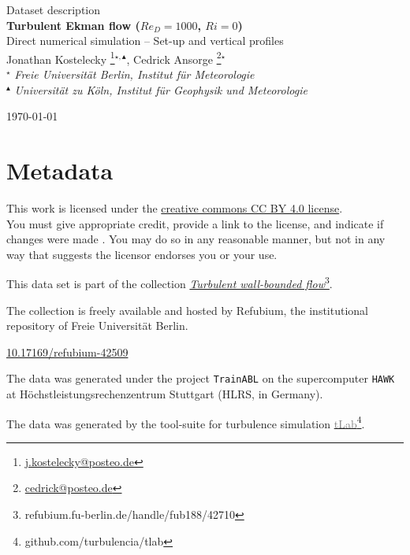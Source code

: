 \documentclass[11pt]{article}
\date{\nodate}
\makeatletter
\newcommand{\dstitle}{Turbulent Ekman flow ($Re_D=1000$, $Ri=0$)}
\newcommand{\subtitle}{Direct numerical simulation -- Set-up and vertical profiles}
\newcommand{\doi}{10.17169/refubium-42509}
\newcommand{\tlabName}{\textcolor{gray}{tLab}}
\newcommand{\authors}{
    Jonathan Kostelecky \footnote{\href{mailto:j.kostelecky@posteo.de}{j.kostelecky@posteo.de}}$^{\star,\blacktriangle}$, \hspace{0.05cm}  
    Cedrick Ansorge     \footnote{\href{mailto:cedrick@posteo.de}{cedrick@posteo.de}}$^\star$ \\  
    {\small \light{$^\star$ \emph{ Freie Universit\"at Berlin, Institut f\"ur Meteorologie} \\
    $^{\blacktriangle}$ \emph{Universit\"at zu K\"oln, Institut f\"ur Geophysik und Meteorologie}}}}
\newcommand{\light}[1]{\textcolor{black!80}{#1}}
\newcommand{\printdoi}[1]{\href{https://dx.doi.org/#1}{#1}}
\makeatother
\begin{document}
{ \selectfont
\begin{centering}

 \light{\large Dataset description} \\[1em] 
 {\LARGE \bfseries \sffamily\dstitle} \\[1em]
 \light{\large\subtitle} \\[1em]
 \authors\\ 
\end{centering}
\light{\hfill \today}
}


\section{Metadata}
\begin{description}
\sffamily
\item[\textcopyright] This work is licensed under the \href{https://creativecommons.org/licenses/by/4.0}{creative commons CC BY 4.0 license}. \\ {\small\light{You must give appropriate credit, provide a link to the license, and indicate if changes were made . You may do so in any reasonable manner, but not in any way that suggests the licensor endorses you or your use. }}
\item[\sffamily Collection] This data set is part of the collection \href{https://refubium.fu-berlin.de/handle/fub188/42710}{\emph{Turbulent wall-bounded flow}\footnote{\url{refubium.fu-berlin.de/handle/fub188/42710}}}.

{\small \light{The collection is freely available and hosted by Refubium, the  institutional repository of Freie Universit\"at Berlin.}}

\item[\sffamily DOI]\printdoi{\doi}
\item[\sffamily HPC systems] The data was generated under the project \texttt{TrainABL} on the supercomputer \texttt{HAWK} at Höchstleistungsrechenzentrum Stuttgart (HLRS, in Germany). 
\item[\sffamily Code] The data was generated by the tool-suite for turbulence simulation \href{https://github.com/turbulencia/tlab}{\tlabName\footnote{\url{github.com/turbulencia/tlab}}}.
\end{description}
\end{document}
